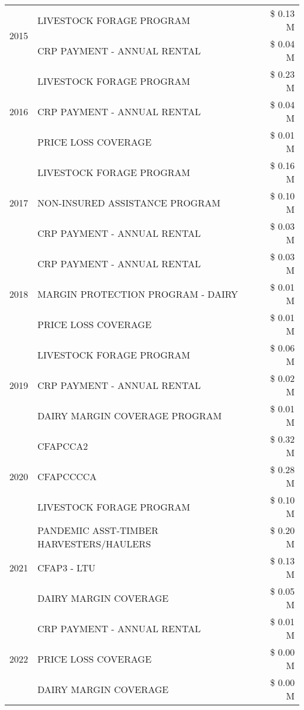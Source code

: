 \begin{tabular}{llr}
\multirow[t]{2}{*}{2015} & LIVESTOCK FORAGE PROGRAM & \$ 0.13 M \\
 & CRP PAYMENT - ANNUAL RENTAL & \$ 0.04 M \\
\cline{1-3}
\multirow[t]{3}{*}{2016} & LIVESTOCK FORAGE PROGRAM & \$ 0.23 M \\
 & CRP PAYMENT - ANNUAL RENTAL & \$ 0.04 M \\
 & PRICE LOSS COVERAGE & \$ 0.01 M \\
\cline{1-3}
\multirow[t]{3}{*}{2017} & LIVESTOCK FORAGE PROGRAM & \$ 0.16 M \\
 & NON-INSURED ASSISTANCE PROGRAM & \$ 0.10 M \\
 & CRP PAYMENT - ANNUAL RENTAL & \$ 0.03 M \\
\cline{1-3}
\multirow[t]{3}{*}{2018} & CRP PAYMENT - ANNUAL RENTAL & \$ 0.03 M \\
 & MARGIN PROTECTION PROGRAM - DAIRY & \$ 0.01 M \\
 & PRICE LOSS COVERAGE & \$ 0.01 M \\
\cline{1-3}
\multirow[t]{3}{*}{2019} & LIVESTOCK FORAGE PROGRAM & \$ 0.06 M \\
 & CRP PAYMENT - ANNUAL RENTAL & \$ 0.02 M \\
 & DAIRY MARGIN COVERAGE PROGRAM & \$ 0.01 M \\
\cline{1-3}
\multirow[t]{3}{*}{2020} & CFAPCCA2 & \$ 0.32 M \\
 & CFAPCCCCA & \$ 0.28 M \\
 & LIVESTOCK FORAGE PROGRAM & \$ 0.10 M \\
\cline{1-3}
\multirow[t]{3}{*}{2021} & PANDEMIC ASST-TIMBER HARVESTERS/HAULERS & \$ 0.20 M \\
 & CFAP3 - LTU & \$ 0.13 M \\
 & DAIRY MARGIN COVERAGE & \$ 0.05 M \\
\cline{1-3}
\multirow[t]{3}{*}{2022} & CRP PAYMENT - ANNUAL RENTAL & \$ 0.01 M \\
 & PRICE LOSS COVERAGE & \$ 0.00 M \\
 & DAIRY MARGIN COVERAGE & \$ 0.00 M \\
\cline{1-3}
\bottomrule
\end{tabular}
